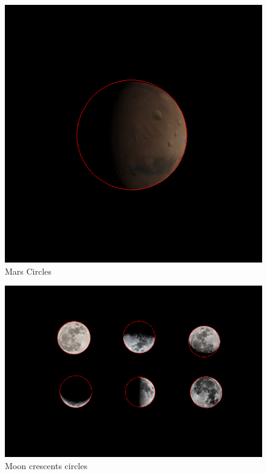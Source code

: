 \begin{figure}[h!]
\centering
  \includegraphics[width = 0.5\linewidth]{../_UnitTest/result_mars.png}
  \caption{Mars Circles}
  \label{fig:mars}
\end{figure}

\begin{figure}[h!]
\centering
  \includegraphics[width = 0.5\linewidth]{../_UnitTest/result_moons.png}
  \caption{Moon crescents circles}
  \label{fig:moons}
\end{figure}

